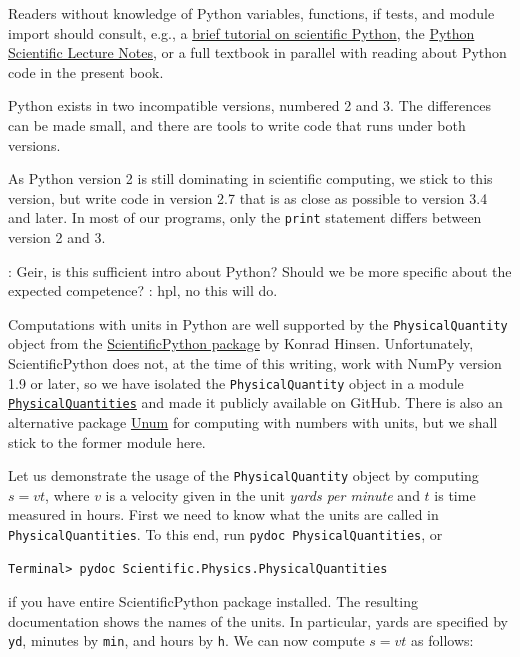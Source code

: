 \documentclass[graybox,envcountchap,sectrefs,final]{svmonodo}
\newcommand{\shortinlinecomment}[3]{{\color{red}{\bf #1}: #2}}
\newcommand{\longinlinecomment}[3]{{\color{red}{\bf #1}: #2}}
\newenvironment{warning_mdfboxadmon}[1][]{
\begin{warning_mdfboxmdframed}[frametitle=#1]
}
{
\end{warning_mdfboxmdframed}
}
\begin{document}
Readers without knowledge of Python variables, functions, if tests,
and module import should consult, e.g., a \href{{http://hplgit.github.io/bumpy/doc/web/index.html}}{brief tutorial on scientific
Python},
the \href{{http://scipy-lectures.github.com/}}{Python Scientific Lecture Notes},
or a full textbook \cite{Langtangen_2012} in parallel with reading about
Python code in the present book.


\begin{warning_mdfboxadmon}
Python exists in two incompatible versions, numbered 2 and 3.
The differences can be made small, and there are tools to write
code that runs under both versions.

As Python version 2 is still dominating
in scientific computing, we stick to this version, but
write code in version 2.7 that is as close as possible to version 3.4
and later. In most of our programs, only the \texttt{print} statement differs
between version 2 and 3.
\end{warning_mdfboxadmon}



\longinlinecomment{hpl 3}{ Geir, is this sufficient intro about Python? Should we be more specific about the expected competence? }{ Geir, is this sufficient }
\shortinlinecomment{Geir 4}{ hpl, no this will do. }{ hpl, no this will }

Computations with units in Python are well supported by the
\texttt{PhysicalQuantity} object from the \href{{https://bitbucket.org/khinsen/scientificpython}}{ScientificPython package} by Konrad
Hinsen. Unfortunately, ScientificPython does not, at the time of this
writing, work with NumPy version 1.9 or later, so we have isolated the
\texttt{PhysicalQuantity} object in a module \href{{https://github.com/hplgit/physical-quantities}}{\nolinkurl{PhysicalQuantities}} and made it publicly
available on GitHub. There is also an alternative package \href{{https://bitbucket.org/kiv/unum/}}{Unum} for computing with numbers with
units, but we shall stick to the former module here.

Let us demonstrate the usage of the \texttt{PhysicalQuantity} object by
computing $s=vt$, where $v$ is a velocity given in the unit \emph{yards per
minute} and $t$ is time measured in hours.  First we need to know what
the units are called in \texttt{PhysicalQuantities}.  To this end, run \texttt{pydoc PhysicalQuantities}, or

\begin{Verbatim}[frame=lines,label=\fbox{{\tiny Terminal}},framesep=2.5mm,framerule=0.7pt,fontsize=\fontsize{9pt}{9pt}]
Terminal> pydoc Scientific.Physics.PhysicalQuantities
\end{Verbatim}
if you have entire ScientificPython package installed. The
resulting documentation shows the names of
the units. In particular,
yards are specified by \texttt{yd}, minutes by \texttt{min}, and hours
by \texttt{h}. We can now compute $s=vt$ as follows:
\end{document}
